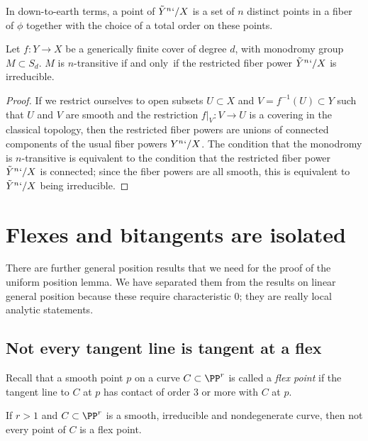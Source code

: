 In down-to-earth terms, a point of $\tilde Y^n`/X$ is a set of $n$
distinct points in a fiber of $\phi$ together with
the choice of a total order on these points.

\begin{lemma}\label{transitivity lemma}
Let $f : Y \to X$ be a generically finite cover of degree $d$, with
monodromy group $M \subset S_d$.
$M$ is $n$-transitive if and only~if the restricted fiber power $\tilde
Y^n`/X$ is irreducible.
\end{lemma}

\begin{proof}
If we restrict ourselves to open subsets $U \subset X$ and $V = f^{-1}(U)
\subset Y$ such that $U$ and $V$ are smooth and the restriction $f|_V :
V \to U$ is a covering in the classical topology, then the restricted
fiber powers are unions of connected components of the usual fiber
powers $Y^n`/X$. The condition that the monodromy is $n$-transitive is
equivalent to the condition that the restricted fiber power $\tilde Y^n`/X$
is connected; since the fiber powers are all smooth, this is equivalent
to $\tilde Y^n`/X$ being irreducible.
\end{proof}



\section{Flexes and bitangents are isolated}\label{isolated flexes
and bitangents}

There are  further general position results that we need for the proof
of the uniform position lemma.  We have separated
them from the results on linear general position because these require
characteristic 0; they are really local analytic
statements.

\subsection*{Not every tangent line is tangent at a flex}


Recall that a smooth point $p$ on a curve $C \subset \PP^r$ is called
a \emph{flex point} if the tangent line to $C$ at  $p$ has contact of
%
order 3 or more with $C$ at $p$.

\begin{lemma}\label{finite inflections}
If $r>1$ and $C \subset \PP^r$ is a smooth, irreducible and nondegenerate
curve, then not every point of $C$ is a flex point.
\unif
\end{lemma}

